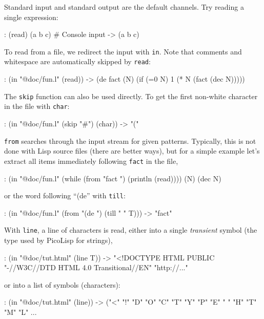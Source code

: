 Standard input and standard output are the default channels. Try reading
a single expression:


\begin{wideverbatim}
: (read)
(a b c)        # Console input
-> (a b c)
\end{wideverbatim}

To read from a file, we redirect the input with \texttt{in}. Note that comments
and whitespace are automatically skipped by \texttt{read}:


\begin{wideverbatim}
: (in "@doc/fun.l" (read))
-> (de fact (N) (if (=0 N) 1 (* N (fact (dec N)))))
\end{wideverbatim}

The \texttt{skip} function can also be used directly. To get the first
non-white character in the file with \texttt{char}:


\begin{wideverbatim}
: (in "@doc/fun.l" (skip "#") (char))
-> "("
\end{wideverbatim}

\texttt{from} searches through the input stream for given patterns. Typically,
this is not done with Lisp source files (there are better ways), but for
a simple example let's extract all items immediately following \texttt{fact} in
the file,


\begin{wideverbatim}
: (in "@doc/fun.l" (while (from "fact ") (println (read))))
(N)
(dec N)
\end{wideverbatim}

or the word following ``(de'' with \texttt{till}:


\begin{wideverbatim}
: (in "@doc/fun.l" (from "(de ") (till " " T)))
-> "fact"
\end{wideverbatim}

With \texttt{line}, a line of characters is read, either into a single
\emph{transient} symbol (the type used by PicoLisp
for strings),


\begin{wideverbatim}
: (in "@doc/tut.html" (line T))
-> "<!DOCTYPE HTML PUBLIC "-//W3C//DTD HTML 4.0 Transitional//EN" "http://..."
\end{wideverbatim}

or into a list of symbols (characters):


\begin{wideverbatim}
: (in "@doc/tut.html" (line))
-> ("<" "!" "D" "O" "C" "T" "Y" "P" "E" " " "H" "T" "M" "L" ...
\end{wideverbatim}

